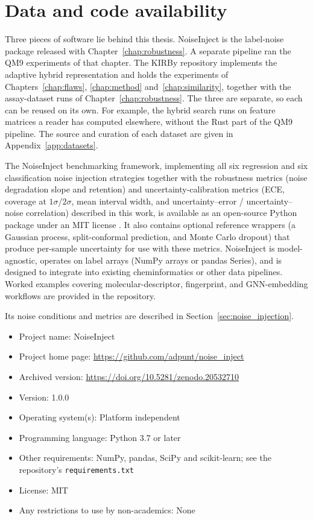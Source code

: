\chapter{Data and code availability}\label{app:availability}

Three pieces of software lie behind this thesis. NoiseInject is the label-noise package released with Chapter~\ref{chap:robustness}. A separate pipeline ran the QM9 experiments of that chapter. The KIRBy repository implements the adaptive hybrid representation and holds the experiments of Chapters~\ref{chap:flaws}, \ref{chap:method} and~\ref{chap:similarity}, together with the assay-dataset runs of Chapter~\ref{chap:robustness}. The three are separate, so each can be reused on its own. For example, the hybrid search runs on feature matrices a reader has computed elsewhere, without the Rust part of the QM9 pipeline. The source and curation of each dataset are given in Appendix~\ref{app:datasets}.

The NoiseInject benchmarking framework, implementing all six regression and six classification noise injection strategies together with the robustness metrics (noise degradation slope and retention) and uncertainty-calibration metrics (ECE, coverage at $1\sigma$/$2\sigma$, mean interval width, and uncertainty--error / uncertainty--noise correlation) described in this work, is available as an open-source Python package under an MIT license \citep{noiseinject}. It also contains optional reference wrappers (a Gaussian process, split-conformal prediction, and Monte Carlo dropout) that produce per-sample uncertainty for use with these metrics. NoiseInject is model-agnostic, operates on label arrays (NumPy arrays or pandas Series), and is designed to integrate into existing cheminformatics or other data pipelines. Worked examples covering molecular-descriptor, fingerprint, and GNN-embedding workflows are provided in the repository.

Its noise conditions and metrics are described in Section~\ref{sec:noise_injection}.

\begin{itemize}
    \item Project name: NoiseInject
    \item Project home page: \url{https://github.com/adpunt/noise_inject}
    \item Archived version: \url{https://doi.org/10.5281/zenodo.20532710}
    \item Version: 1.0.0
    \item Operating system(s): Platform independent
    \item Programming language: Python 3.7 or later
    \item Other requirements: NumPy, pandas, SciPy and scikit-learn; see the repository's \texttt{requirements.txt}
    \item License: MIT
    \item Any restrictions to use by non-academics: None
\end{itemize}


